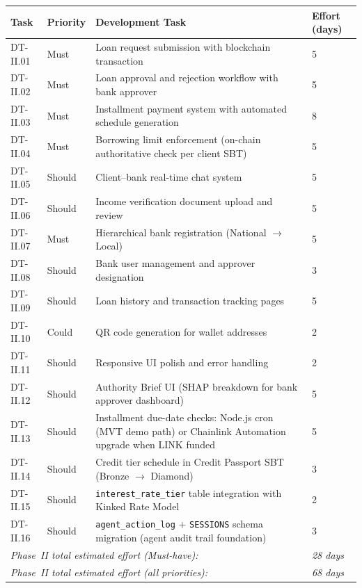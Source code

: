 \documentclass[12pt,a4paper]{report}
\newcommand{\tableheadcolor}{\rowcolor{TableHeadBg}}
\begin{document}
\begin{table}[H]
\centering
\begin{tabular}{p{1.8cm}p{1.8cm}p{7.5cm}p{1.5cm}}
\toprule
\tableheadcolor
\textbf{Task} & \textbf{Priority} & \textbf{Development Task} & \textbf{Effort (days)} \\
\midrule
DT-II.01 & Must & Loan request submission with blockchain transaction & 5 \\
DT-II.02 & Must & Loan approval and rejection workflow with bank approver & 5 \\
DT-II.03 & Must & Installment payment system with automated schedule generation & 8 \\
DT-II.04 & Must & Borrowing limit enforcement (on-chain authoritative check per client SBT) & 5 \\
DT-II.05 & Should & Client--bank real-time chat system & 5 \\
DT-II.06 & Should & Income verification document upload and review & 5 \\
DT-II.07 & Must & Hierarchical bank registration (National $\to$ Local) & 5 \\
DT-II.08 & Should & Bank user management and approver designation & 3 \\
DT-II.09 & Should & Loan history and transaction tracking pages & 5 \\
DT-II.10 & Could & QR code generation for wallet addresses & 2 \\
DT-II.11 & Should & Responsive UI polish and error handling & 2 \\
DT-II.12 & Should & Authority Brief UI (SHAP breakdown for bank approver dashboard) & 5 \\
DT-II.13 & Should & Installment due-date checks: Node.js cron (MVT demo path) or Chainlink Automation upgrade when LINK funded & 5 \\
DT-II.14 & Should & Credit tier schedule in Credit Passport SBT (Bronze $\to$ Diamond) & 3 \\
DT-II.15 & Should & \texttt{interest\_rate\_tier} table integration with Kinked Rate Model & 2 \\
DT-II.16 & Should & \texttt{agent\_action\_log} + \texttt{SESSIONS} schema migration (agent audit trail foundation) & 3 \\
\multicolumn{3}{l}{\textit{Phase~II total estimated effort (Must-have):}} & \textit{28 days} \\
\multicolumn{3}{l}{\textit{Phase~II total estimated effort (all priorities):}} & \textit{68 days} \\
\bottomrule
\end{tabular}
\end{table}
\end{document}
